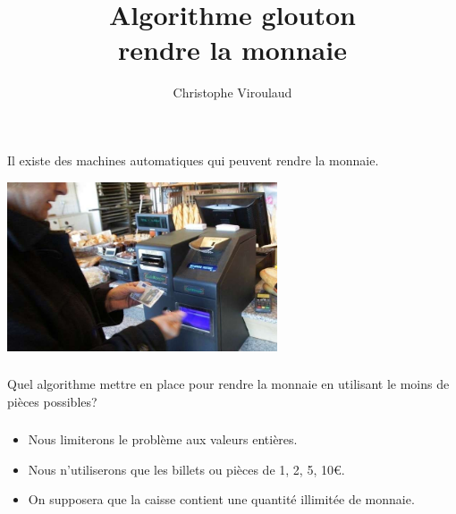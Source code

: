 \documentclass[svgnames,11pt]{beamer}
\author[]{Christophe Viroulaud}
\title{Algorithme glouton\\rendre la monnaie}
\date{\framebox{\textbf{Algo}}}
\institute{Première - NSI}
\begin{document}
\begin{frame}
    \titlepage
\end{frame}
\begin{frame}
    \frametitle{}

    Il existe des machines automatiques qui peuvent rendre la monnaie.
    \begin{center}
        \centering
        \includegraphics[width=8cm]{ressources/caisse.jpg}
        \label{IMG}
    \end{center}

\end{frame}
\begin{frame}
    \frametitle{}

    \begin{framed}
        \centering Quel algorithme mettre en place pour rendre la monnaie en utilisant le moins de pièces possibles?
    \end{framed}

\end{frame}
\begin{frame}
    \frametitle{}

    \begin{aretenir}[Remarques]
        \begin{itemize}
            \item Nous limiterons le problème aux valeurs entières.
            \item Nous n'utiliserons que les billets ou pièces de 1, 2, 5, 10€.
            \item On supposera que la caisse contient une quantité illimitée de monnaie.
        \end{itemize}
    \end{aretenir}

\end{frame}
\end{document}
